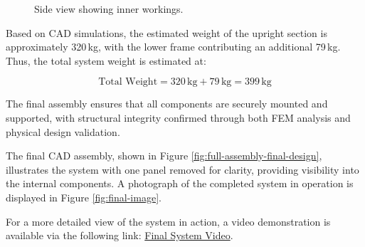 \begin{figure}[H]
\begin{minipage}[b]{0.35\linewidth}
        \caption{Side view showing inner workings.}
        \label{fig:chain-tensioning-photo}
    \end{minipage}
\end{figure}



Based on CAD simulations, the estimated weight of the upright section is approximately 320\,kg, with the lower frame contributing an additional 79\,kg. Thus, the total system weight is estimated at:

\[
\text{Total Weight} = 320\,\text{kg} + 79\,\text{kg} = 399\,\text{kg}
\]

The final assembly ensures that all components are securely mounted and supported, with structural integrity confirmed through both FEM analysis and physical design validation.

The final CAD assembly, shown in Figure \ref{fig:full-assembly-final-design}, illustrates the system with one panel removed for clarity, providing visibility into the internal components. A photograph of the completed system in operation is displayed in Figure \ref{fig:final-image}.

For a more detailed view of the system in action, a video demonstration is available via the following link: \href{https://youtube.com/shorts/J7KnqL9NdjM}{Final System Video}.


